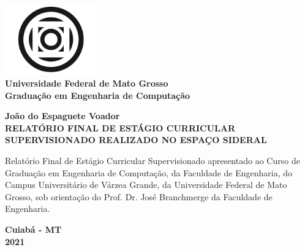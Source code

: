\documentclass[12pt]{article}
\newcommand{\autorrel}{João do Espaguete Voador}
\newcommand{\titulorel}{RELATÓRIO FINAL DE ESTÁGIO CURRICULAR SUPERVISIONADO REALIZADO NO ESPAÇO SIDERAL}
\newcommand{\orientadorrel}{Prof. Dr. José Branchmerge }
\newcommand{\cidaderel}{Cuiabá - MT}
\newcommand{\anorel}{2021}
\begin{document}
    \begin{titlepage}
        \centering
        \includegraphics[width=4cm]{assets/logo-ufmt.png}\\
        {   
            \fontsize{14pt}{14}\selectfont 
            \textbf{Universidade Federal de Mato Grosso} \\
            \textbf{Graduação em Engenharia de Computação} \\
        }
        
        \vfill
        {\textbf{\autorrel}\\}
        {
            \fontsize{14pt}{20}\selectfont
            \textbf{\titulorel}\\
        }
        {
            \begin{quoting}[leftmargin=6cm, rightmargin=0cm]
                \fontsize{10pt}{15}\selectfont
                Relatório Final de Estágio Curricular Supervisionado apresentado 
                ao Curso de Graduação em Engenharia de Computação, da Faculdade 
                de Engenharia, do Campus Universitário de Várzea Grande, da 
                Universidade Federal de Mato Grosso, sob orientação do \orientadorrel da Faculdade de Engenharia.
            \end{quoting}
        }   
        \vfill

        {\textbf{\cidaderel}\\}
        {\textbf{\anorel}}
    \end{titlepage}

    

    
\end{document}
